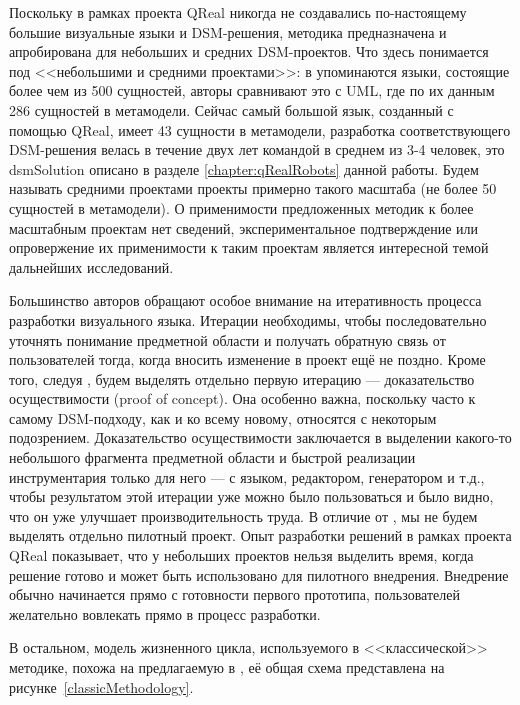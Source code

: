 Поскольку в рамках проекта QReal никогда не создавались по-настоящему большие визуальные 
языки и \ac{DSM}-решения, методика предназначена и апробирована для небольших и средних \ac{DSM}-проектов. 
Что здесь понимается под <<небольшими и средними проектами>>: в \cite{luoma2004defining} 
упоминаются языки, состоящие более чем из 500 сущностей, авторы сравнивают это с UML, 
где по их данным 286 сущностей в метамодели. Сейчас самый большой язык, созданный с 
помощью QReal, имеет 43 сущности в метамодели, разработка соответствующего \ac{DSM}-решения 
велась в течение двух лет командой в среднем из 3-4 человек, это \ac{dsmSolution} описано в 
разделе \ref{chapter:qRealRobots} данной работы. Будем называть средними проектами 
проекты примерно такого масштаба (не более 50 сущностей в метамодели). О применимости предложенных методик
к более масштабным проектам нет сведений, экспериментальное подтверждение или опровержение
их применимости к таким проектам является интересной темой дальнейших исследований.

Большинство авторов обращают особое внимание на итеративность процесса разработки 
визуального языка. Итерации необходимы, чтобы последовательно уточнять понимание предметной 
области и получать обратную связь от пользователей тогда, когда вносить изменение 
в проект ещё не поздно. Кроме того, следуя \cite{kelly2008domain}, будем выделять отдельно 
первую итерацию --- доказательство осуществимости (proof of concept). Она особенно важна, 
поскольку часто к самому \ac{DSM}-подходу, как и ко всему новому, относятся с некоторым 
подозрением. Доказательство осуществимости заключается в выделении какого-то небольшого 
фрагмента предметной области и быстрой реализации инструментария только для него --- 
с языком, редактором, генератором и т.д., чтобы результатом этой итерации уже можно 
было пользоваться и было видно, что он уже улучшает производительность труда. В отличие 
от \cite{kelly2008domain}, мы не будем выделять отдельно пилотный проект. Опыт разработки 
решений в рамках проекта QReal показывает, что у небольших проектов нельзя выделить 
время, когда решение готово и может быть использовано для пилотного внедрения. Внедрение 
обычно начинается прямо с готовности первого прототипа, пользователей желательно вовлекать 
прямо в процесс разработки.

В остальном, модель жизненного цикла, используемого в <<классической>> методике, 
похожа на предлагаемую в \cite{koznov2008development}, её общая схема представлена на 
рисунке~\ref{classicMethodology}.

